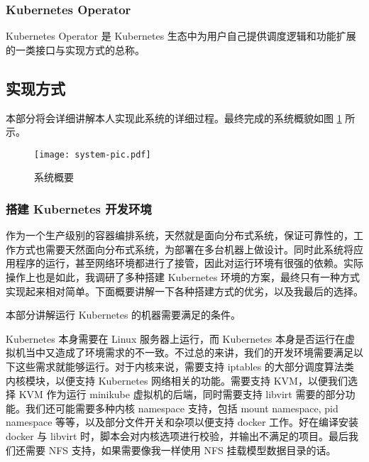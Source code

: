 \subsubsection{Kubernetes Operator}

Kubernetes Operator \cite{operator} 是 Kubernetes 生态中为用户自己提供调度逻辑和功能扩展的一类接口与实现方式的总称。

\subsection{实现方式}

本部分将会详细讲解本人实现此系统的详细过程。最终完成的系统概貌如图 \ref{fig:system} 所示。

\begin{figure}

\centering

\texttt{[image: system-pic.pdf]}

\caption{系统概要}\label{fig:system}

\end{figure}

\subsubsection{搭建 Kubernetes 开发环境}

作为一个生产级别的容器编排系统，天然就是面向分布式系统，保证可靠性的，工作方式也需要天然面向分布式系统，为部署在多台机器上做设计。同时此系统将应用程序的运行，甚至网络环境都进行了接管，因此对运行环境有很强的依赖。实际操作上也是如此，我调研了多种搭建 Kubernetes 环境的方案，最终只有一种方式实现起来相对简单。下面概要讲解一下各种搭建方式的优劣，以及我最后的选择。


本部分讲解运行 Kubernetes 的机器需要满足的条件。

Kubernetes 本身需要在 Linux 服务器上运行，而 Kubernetes 本身是否运行在虚拟机当中又造成了环境需求的不一致。不过总的来讲，我们的开发环境需要满足以下这些需求就能够运行。对于内核来说，需要支持 iptables 的大部分调度算法类内核模块，以便支持 Kubernetes 网络相关的功能。需要支持 KVM，以便我们选择 KVM 作为运行 minikube 虚拟机的后端，同时需要支持 libvirt 需要的部分功能。我们还可能需要多种内核 namespace 支持，包括 mount namespace, pid namespace 等等，以及部分文件开关和杂项以便支持 docker 工作。好在编译安装 docker 与 libvirt 时，脚本会对内核选项进行校验，并输出不满足的项目。最后我们还需要 NFS 支持，如果需要像我一样使用 NFS 挂载模型数据目录的话。

